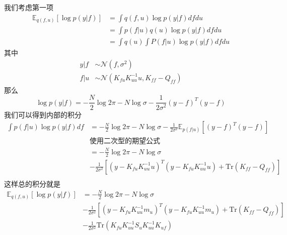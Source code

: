 我们考虑第一项
\begin{equation}
    \begin{aligned}
        \mathbb E_{q(f, u)} \left [ \log p(y|f) \right ] &= \int q(f, u) \log p(y|f) df du \\
        &= \int p(f|u) q(u) \log p(y|f) df du \\
        &= \int q(u) \int P(f|u) \log p(y|f) df du
    \end{aligned}
\end{equation}
其中
\begin{equation}
    \begin{aligned}
        y|f & \sim \mathcal N(f, \sigma^2) \\
        f|u & \sim \mathcal N(K_{fu}K_{uu}^{-1}u, K_{ff} - Q_{ff})
    \end{aligned}
\end{equation}
那么
\begin{equation}
    \log p(y|f) = -\frac{N}{2} \log 2\pi - N \log \sigma - \frac{1}{2\sigma^2} (y-f)^T(y-f)
\end{equation}
我们可以得到内部的积分
\begin{equation}
    \begin{aligned}
        \int p(f|u) \log p(y|f) df &= -\frac{N}{2} \log 2\pi - N \log \sigma - \frac{1}{2\sigma^2} \mathbb E_{p(f|u)} \left [ (y-f)^T(y-f) \right ] \\
        & \text{使用二次型的期望公式} \\
        &= -\frac{N}{2} \log 2\pi - N \log \sigma \\
        &- \frac{1}{2\sigma^2} \left [ (y - K_{fu}K_{uu}^{-1}u)^T(y - K_{fu}K_{uu}^{-1}u) + \text{Tr}(K_{ff} - Q_{ff}) \right ] \\
    \end{aligned}
\end{equation}
这样总的积分就是
\begin{equation}
    \begin{aligned}
        \mathbb E_{q(f, u)} \left [ \log p(y|f) \right ] &= -\frac{N}{2} \log 2\pi - N \log \sigma \\
        &- \frac{1}{2\sigma^2} \left [ (y - K_{fu}K_{uu}^{-1}m_u)^T(y - K_{fu}K_{uu}^{-1}m_u) + \text{Tr}(K_{ff} - Q_{ff}) \right ] \\
        &- \frac{1}{2\sigma^2} \text{Tr}(K_{fu}K_{uu}^{-1}S_u K_{uu}^{-1}K_{uf})
    \end{aligned}
\end{equation}

